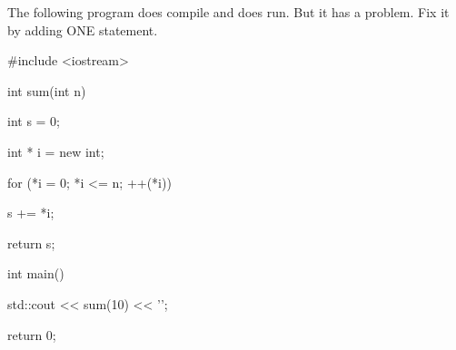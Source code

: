 The following program does compile and does run. But it has a problem. Fix it by adding ONE statement.



\begin{consolethree}[escapeinside=||]

#include <iostream>



int sum(int n)

{

    int s = 0;

    int * i = new int;

    for (*i = 0; *i <= n; ++(*i))

    {

        s += *i;

    }

    return s;

}



int main()

{   

    std::cout << sum(10) << '\n';

    return 0;

}

\end{consolethree}

